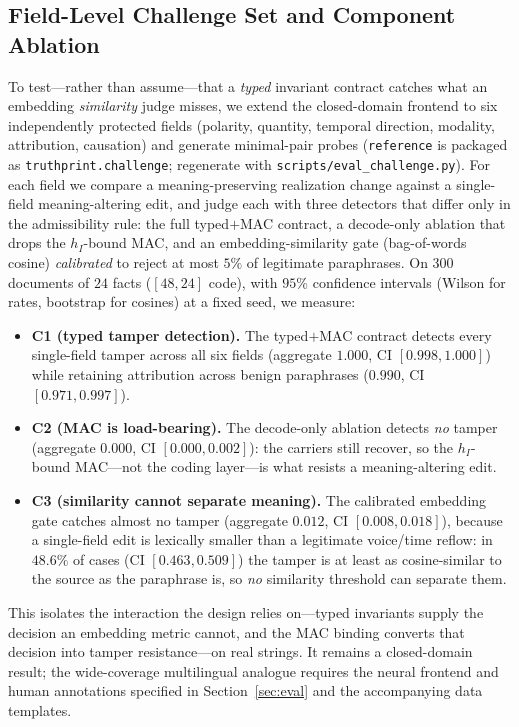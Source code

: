 \documentclass[journal]{IEEEtran}
\begin{document}
\subsection{Field-Level Challenge Set and Component Ablation}
\label{sec:challenge}
To test---rather than assume---that a \emph{typed} invariant contract catches
what an embedding \emph{similarity} judge misses, we extend the closed-domain
frontend to six independently protected fields (polarity, quantity, temporal
direction, modality, attribution, causation) and generate minimal-pair probes
(\texttt{reference} is packaged as \texttt{truthprint.challenge}; regenerate
with \texttt{scripts/eval\_challenge.py}). For each field we compare a
meaning-preserving realization change against a single-field meaning-altering
edit, and judge each with three detectors that differ only in the admissibility
rule: the full typed$+$MAC contract, a decode-only ablation that drops the
$h_I$-bound MAC, and an embedding-similarity gate (bag-of-words cosine)
\emph{calibrated} to reject at most $5\%$ of legitimate paraphrases. On $300$
documents of $24$ facts ($[48,24]$ code), with $95\%$ confidence intervals
(Wilson for rates, bootstrap for cosines) at a fixed seed, we measure:
\begin{itemize}[leftmargin=*]
  \item \textbf{C1 (typed tamper detection).} The typed$+$MAC contract detects
  every single-field tamper across all six fields (aggregate
  $1.000$, CI $[0.998,1.000]$) while retaining attribution across benign
  paraphrases ($0.990$, CI $[0.971,0.997]$).
  \item \textbf{C2 (MAC is load-bearing).} The decode-only ablation detects
  \emph{no} tamper (aggregate $0.000$, CI $[0.000,0.002]$): the carriers still
  recover, so the $h_I$-bound MAC---not the coding layer---is what resists a
  meaning-altering edit.
  \item \textbf{C3 (similarity cannot separate meaning).} The calibrated
  embedding gate catches almost no tamper (aggregate $0.012$, CI
  $[0.008,0.018]$), because a single-field edit is lexically smaller than a
  legitimate voice/time reflow: in $48.6\%$ of cases (CI $[0.463,0.509]$) the
  tamper is at least as cosine-similar to the source as the paraphrase is, so
  \emph{no} similarity threshold can separate them.
\end{itemize}
This isolates the interaction the design relies on---typed invariants supply the
decision an embedding metric cannot, and the MAC binding converts that decision
into tamper resistance---on real strings. It remains a closed-domain result;
the wide-coverage multilingual analogue requires the neural frontend and human
annotations specified in Section~\ref{sec:eval} and the accompanying data
templates.
\end{document}
